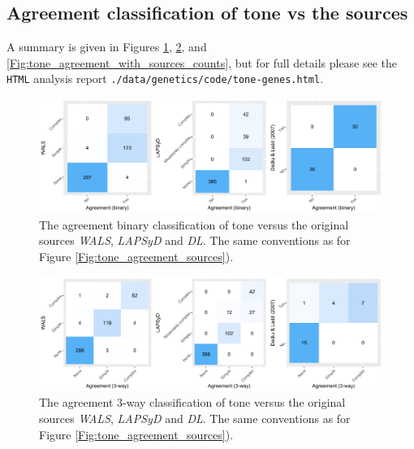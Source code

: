 \documentclass[twoside,twocolumn]{article}
\begin{document}
\subsection{Agreement classification of tone vs the sources} \label{SM:tone_agreeemnt_with_sources}

A summary is given in Figures \ref{Fig:tone_agreement_with_sources_binary},  \ref{Fig:tone_agreement_with_sources_3way}, and  \ref{Fig:tone_agreement_with_sources_counts}, but for full details please see the \texttt{HTML} analysis report \verb|./data/genetics/code/tone-genes.html|.

\begin{figure}[h]
  \centering
  \includegraphics[width=\textwidth]{../../code/figures/tone_agreement_with_sources_binary}
  \caption{The agreement binary classification of tone versus the original sources \textit{WALS}, \textit{LAPSyD} and \textit{DL}. The same conventions as for Figure \ref{Fig:tone_agreement_sources}).}
  \label{Fig:tone_agreement_with_sources_binary}
\end{figure}

\begin{figure}[h]
  \centering
  \includegraphics[width=\textwidth]{../../code/figures/tone_agreement_with_sources_3way}
  \caption{The agreement 3-way classification of tone versus the original sources \textit{WALS}, \textit{LAPSyD} and \textit{DL}. The same conventions as for Figure \ref{Fig:tone_agreement_sources}).}
  \label{Fig:tone_agreement_with_sources_3way}
\end{figure}
\end{document}
